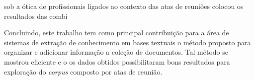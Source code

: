 


sob a ótica de profissionais ligados ao contexto das atas de reuniões 
colocou os resultados das combi






Concluindo, este trabalho tem como principal contribuição para a área de sistemas de extração de conhecimento em bases textuais o método proposto para organizar e adicionar informação a coleção de documentos. Tal método se mostrou eficiente e o os dados obtidos possibilitaram bons resultados para exploração do \textit{corpus} composto por atas de reunião.


























































